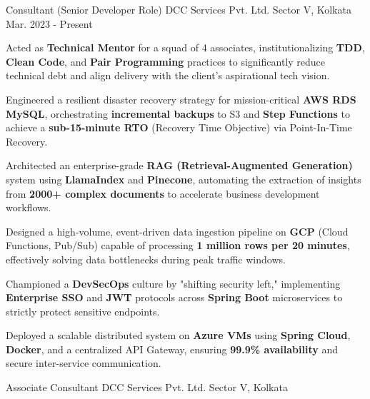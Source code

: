 \renewcommand{\baselinestretch}{1.05} %

\begin{cventries}
\cventry
    {Consultant (Senior Developer Role)}
    {DCC Services Pvt. Ltd.}
    {Sector V, Kolkata}
    {Mar. 2023 - Present}
    {
      \begin{cvitems}
        \setlength\itemsep{3.5mm}
        \item {Acted as \textbf{Technical Mentor} for a squad of 4 associates, institutionalizing \textbf{TDD}, \textbf{Clean Code}, and \textbf{Pair Programming} practices to significantly reduce technical debt and align delivery with the client’s aspirational tech vision.}
        \item {Engineered a resilient disaster recovery strategy for mission-critical \textbf{AWS RDS MySQL}, orchestrating \textbf{incremental backups} to S3 and \textbf{Step Functions} to achieve a \textbf{sub-15-minute RTO} (Recovery Time Objective) via Point-In-Time Recovery.}
        \item {Architected an enterprise-grade \textbf{RAG (Retrieval-Augmented Generation)} system using \textbf{LlamaIndex} and \textbf{Pinecone}, automating the extraction of insights from \textbf{2000+ complex documents} to accelerate business development workflows.}
        \item {Designed a high-volume, event-driven data ingestion pipeline on \textbf{GCP} (Cloud Functions, Pub/Sub) capable of processing \textbf{1 million rows per 20 minutes}, effectively solving data bottlenecks during peak traffic windows.}
        \item {Championed a \textbf{DevSecOps} culture by "shifting security left," implementing \textbf{Enterprise SSO} and \textbf{JWT} protocols across \textbf{Spring Boot} microservices to strictly protect sensitive endpoints.}
        \item {Deployed a scalable distributed system on \textbf{Azure VMs} using \textbf{Spring Cloud}, \textbf{Docker}, and a centralized API Gateway, ensuring \textbf{99.9\% availability} and secure inter-service communication.}
      \end{cvitems}
    }
    \vspace{8mm}
  \cventry
    {Associate Consultant}
    {DCC Services Pvt. Ltd.}
    {Sector V, Kolkata}

\end{cventries}
